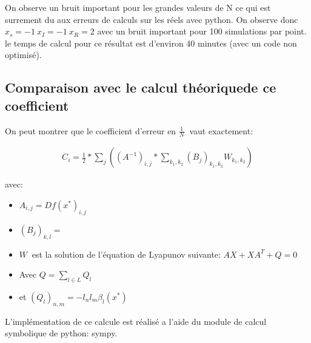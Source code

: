 \documentclass[a4paper]{article}
\begin{document}
On observe un bruit important pour les grandes valeurs de N ce qui est
surrement du aux erreurs de calculs sur les réels avec python. On
observe donc $x_s=-1 \ x_I=-1\ x_R=2$ avec un bruit important pour 100
simulations par point. le temps de calcul pour ce résultat est
d'environ 40 minutes (avec un code non optimisé).

\subsection{Comparaison avec le calcul théoriquede ce coefficient}
On peut montrer que le coefficient d'erreur en $\frac{1}{N} \ $ vaut
exactement: \cite{meanfieldaprox}

\begin{eqnarray*}
  C_i=\frac{1}{2}*\sum_{j}((A^{-1})_{i,j}*\sum_{k_1,k_2}(B_j)_{k_1,k_2}W_{k_1,k_2})
\end{eqnarray*}

avec:
\begin{itemize}
\item $A_{i,j}=Df(x^*)_{i,j}$
\item $(B_j)_{k,l}=$
\item $W \ $ est la solution de l'équation de Lyapunov suivante: $AX+XA^T+Q=0$
\item Avec $Q=\sum_{l \in L} Q_l$
\item et $(Q_l)_{n,m}=-l_nl_m \beta_l(x^*)$
\end{itemize}

L'implémentation de ce calcule est réalisé a l'aide du module de
calcul symbolique de python: sympy.
\end{document}
